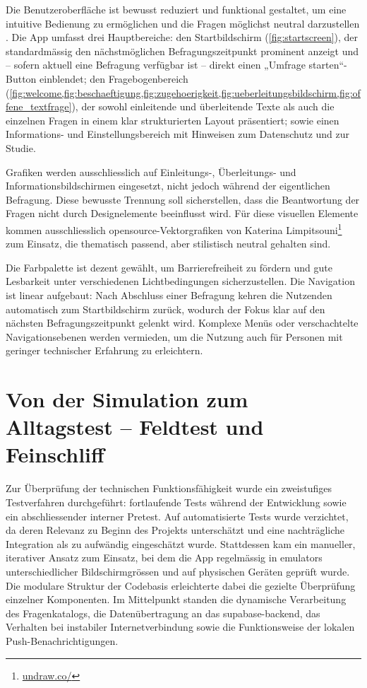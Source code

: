 Die Benutzeroberfläche ist bewusst reduziert und funktional gestaltet, um eine intuitive Bedienung zu ermöglichen und die Fragen möglichst neutral darzustellen \parencite{rogersInteractionDesignHumancomputer2023}. Die App umfasst drei Hauptbereiche: den Startbildschirm (\cref{fig:startscreen}), der standardmässig den nächstmöglichen Befragungszeitpunkt prominent anzeigt und -- sofern aktuell eine Befragung verfügbar ist -- direkt einen „Umfrage starten“-Button einblendet; den Fragebogenbereich (\cref{fig:welcome,fig:beschaeftigung,fig:zugehoerigkeit,fig:ueberleitungsbildschirm,fig:offene_textfrage}), der sowohl einleitende und überleitende Texte als auch die einzelnen Fragen in einem klar strukturierten Layout präsentiert; sowie einen Informations- und Einstellungsbereich mit Hinweisen zum Datenschutz und zur Studie.

Grafiken werden ausschliesslich auf Einleitungs-, Überleitungs- und Informationsbildschirmen eingesetzt, nicht jedoch während der eigentlichen Befragung. Diese bewusste Trennung soll sicherstellen, dass die Beantwortung der Fragen nicht durch Designelemente beeinflusst wird. Für diese visuellen Elemente kommen ausschliesslich \gls{opensource}-Vektorgrafiken von Katerina Limpitsouni\footnote{\href{https://undraw.co/}{undraw.co/}} zum Einsatz, die thematisch passend, aber stilistisch neutral gehalten sind.

Die Farbpalette ist dezent gewählt, um Barrierefreiheit zu fördern und gute Lesbarkeit unter verschiedenen Lichtbedingungen sicherzustellen. Die Navigation ist linear aufgebaut: Nach Abschluss einer Befragung kehren die Nutzenden automatisch zum Startbildschirm zurück, wodurch der Fokus klar auf den nächsten Befragungszeitpunkt gelenkt wird. Komplexe Menüs oder verschachtelte Navigationsebenen werden vermieden, um die Nutzung auch für Personen mit geringer technischer Erfahrung zu erleichtern.

\section{Von der Simulation zum Alltagstest -- Feldtest und Feinschliff}
\label{sec:app_entwicklung_feldtest}

Zur Überprüfung der technischen Funktionsfähigkeit wurde ein zweistufiges Testverfahren durchgeführt: fortlaufende Tests während der Entwicklung sowie ein abschliessender interner Pretest. Auf automatisierte Tests wurde verzichtet, da deren Relevanz zu Beginn des Projekts unterschätzt und eine nachträgliche Integration als zu aufwändig eingeschätzt wurde. Stattdessen kam ein manueller, iterativer Ansatz zum Einsatz, bei dem die App regelmässig in \glspl{emulator} unterschiedlicher Bildschirmgrössen und auf physischen Geräten geprüft wurde. Die modulare Struktur der Codebasis erleichterte dabei die gezielte Überprüfung einzelner Komponenten. Im Mittelpunkt standen die dynamische Verarbeitung des Fragenkatalogs, die Datenübertragung an das \gls{supabase}-\gls{backend}, das Verhalten bei instabiler Internetverbindung sowie die Funktionsweise der lokalen Push-Benachrichtigungen.

